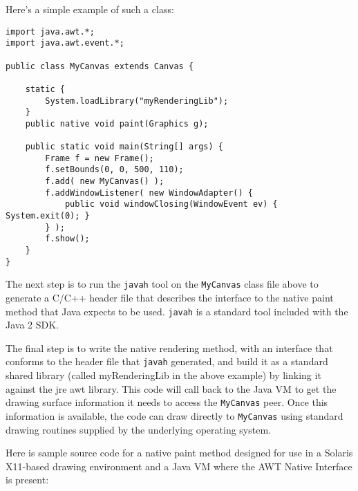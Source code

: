 \documentclass[a4paper]{article}
\newcommand{\code}[1]			{\texttt{#1}}
\begin{document}
Here's a simple example of such a class:
{\small \begin{verbatim}
import java.awt.*;
import java.awt.event.*;

public class MyCanvas extends Canvas {
 
    static {
        System.loadLibrary("myRenderingLib");
    }
    public native void paint(Graphics g);

    public static void main(String[] args) {
        Frame f = new Frame();
        f.setBounds(0, 0, 500, 110);
        f.add( new MyCanvas() );
        f.addWindowListener( new WindowAdapter() {
            public void windowClosing(WindowEvent ev) { System.exit(0); }
        } );
        f.show();
    }
}
\end{verbatim}
}
The next step is to run the \code{javah} tool on the \code{MyCanvas} class file above to generate a C/C++ header file that describes the interface to the native paint method that Java expects to be used. \code{javah} is a standard tool included with the Java 2 SDK.

The final step is to write the native rendering method, with an interface that conforms to the header file that \code{javah} generated, and build it as a standard shared library (called myRenderingLib in the above example) by linking it against the jre awt library. This code will call back to the Java VM to get the drawing surface information it needs to access the \code{MyCanvas} peer. Once this information is available, the code can draw directly to \code{MyCanvas} using standard drawing routines supplied by the underlying operating system.

Here is sample source code for a native paint method designed for use in a Solaris X11-based drawing environment and a Java VM where the AWT Native Interface is present:
\end{document}
